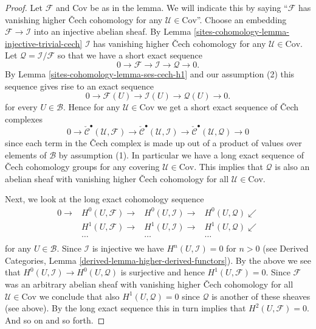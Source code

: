 \begin{proof}
Let $\mathcal{F}$ and $\text{Cov}$ be as in the lemma.
We will indicate this by saying ``$\mathcal{F}$ has vanishing higher
{\v C}ech cohomology for any $\mathcal{U} \in \text{Cov}$''.
Choose an embedding $\mathcal{F} \to \mathcal{I}$ into an
injective abelian sheaf.
By Lemma \ref{sites-cohomology-lemma-injective-trivial-cech} $\mathcal{I}$
has vanishing higher {\v C}ech cohomology for any $\mathcal{U} \in \text{Cov}$.
Let $\mathcal{Q} = \mathcal{I}/\mathcal{F}$
so that we have a short exact sequence
$$
0 \to \mathcal{F} \to \mathcal{I} \to \mathcal{Q} \to 0.
$$
By Lemma \ref{sites-cohomology-lemma-ses-cech-h1} and our assumption (2)
this sequence gives rise to an exact sequence
$$
0 \to \mathcal{F}(U) \to \mathcal{I}(U) \to \mathcal{Q}(U) \to 0.
$$
for every $U \in \mathcal{B}$. Hence for any $\mathcal{U} \in \text{Cov}$
we get a short exact sequence of {\v C}ech complexes
$$
0 \to
\check{\mathcal{C}}^\bullet(\mathcal{U}, \mathcal{F}) \to
\check{\mathcal{C}}^\bullet(\mathcal{U}, \mathcal{I}) \to
\check{\mathcal{C}}^\bullet(\mathcal{U}, \mathcal{Q}) \to 0
$$
since each term in the {\v C}ech complex is made up out of a product of
values over elements of $\mathcal{B}$ by assumption (1).
In particular we have a long exact sequence of {\v C}ech cohomology
groups for any covering $\mathcal{U} \in \text{Cov}$.
This implies that $\mathcal{Q}$ is also an abelian sheaf
with vanishing higher {\v C}ech cohomology for all
$\mathcal{U} \in \text{Cov}$.

\medskip\noindent
Next, we look at the long exact cohomology sequence
$$
\begin{array}{cccc}0 \longrightarrow & H^0(U, \mathcal{F}) \longrightarrow & H^0(U, \mathcal{I}) \longrightarrow & H^0(U, \mathcal{Q}) \swarrow \\  & H^1(U, \mathcal{F}) \longrightarrow & H^1(U, \mathcal{I}) \longrightarrow & H^1(U, \mathcal{Q}) \swarrow \\  & \ldots & \ldots & \ldots \\  &  &  & \end{array}
$$
for any $U \in \mathcal{B}$. Since $\mathcal{I}$ is injective we
have $H^n(U, \mathcal{I}) = 0$ for $n > 0$ (see
Derived Categories, Lemma \ref{derived-lemma-higher-derived-functors}).
By the above we see that $H^0(U, \mathcal{I}) \to H^0(U, \mathcal{Q})$
is surjective and hence $H^1(U, \mathcal{F}) = 0$.
Since $\mathcal{F}$ was an arbitrary abelian sheaf with
vanishing higher {\v C}ech cohomology for all $\mathcal{U} \in \text{Cov}$
we conclude that also $H^1(U, \mathcal{Q}) = 0$ since $\mathcal{Q}$ is
another of these sheaves (see above). By the long exact sequence this in
turn implies that $H^2(U, \mathcal{F}) = 0$. And so on and so forth.
\end{proof}

